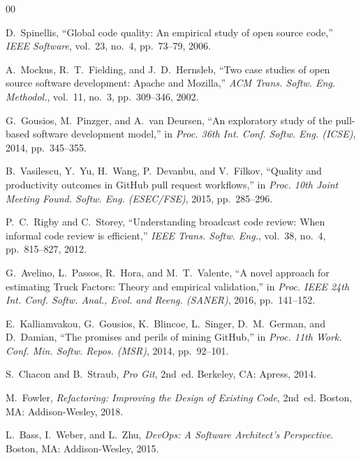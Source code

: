 \documentclass[conference]{IEEEtran}
\begin{document}
\begin{thebibliography}{00}

D.~Spinellis, ``Global code quality: An empirical study of open source code,'' \emph{IEEE Software}, vol.~23, no.~4, pp.~73--79, 2006.

A.~Mockus, R.~T.~Fielding, and J.~D.~Hernsleb, ``Two case studies of open source software development: Apache and Mozilla,'' \emph{ACM Trans. Softw. Eng. Methodol.}, vol.~11, no.~3, pp.~309--346, 2002.

G.~Gousios, M.~Pinzger, and A.~van Deursen, ``An exploratory study of the pull-based software development model,'' in \emph{Proc. 36th Int. Conf. Softw. Eng. (ICSE)}, 2014, pp.~345--355.

B.~Vasilescu, Y.~Yu, H.~Wang, P.~Devanbu, and V.~Filkov, ``Quality and productivity outcomes in GitHub pull request workflows,'' in \emph{Proc. 10th Joint Meeting Found. Softw. Eng. (ESEC/FSE)}, 2015, pp.~285--296.

P.~C.~Rigby and C.~Storey, ``Understanding broadcast code review: When informal code review is efficient,'' \emph{IEEE Trans. Softw. Eng.}, vol.~38, no.~4, pp.~815--827, 2012.

G.~Avelino, L.~Passos, R.~Hora, and M.~T.~Valente, ``A novel approach for estimating Truck Factors: Theory and empirical validation,'' in \emph{Proc. IEEE 24th Int. Conf. Softw. Anal., Evol. and Reeng. (SANER)}, 2016, pp.~141--152.

E.~Kalliamvakou, G.~Gousios, K.~Blincoe, L.~Singer, D.~M.~German, and D.~Damian, ``The promises and perils of mining GitHub,'' in \emph{Proc. 11th Work. Conf. Min. Softw. Repos. (MSR)}, 2014, pp.~92--101.

S.~Chacon and B.~Straub, \emph{Pro Git}, 2nd~ed. Berkeley, CA: Apress, 2014.

M.~Fowler, \emph{Refactoring: Improving the Design of Existing Code}, 2nd~ed. Boston, MA: Addison-Wesley, 2018.

L.~Bass, I.~Weber, and L.~Zhu, \emph{DevOps: A Software Architect's Perspective}. Boston, MA: Addison-Wesley, 2015.

\end{thebibliography}
\end{document}
